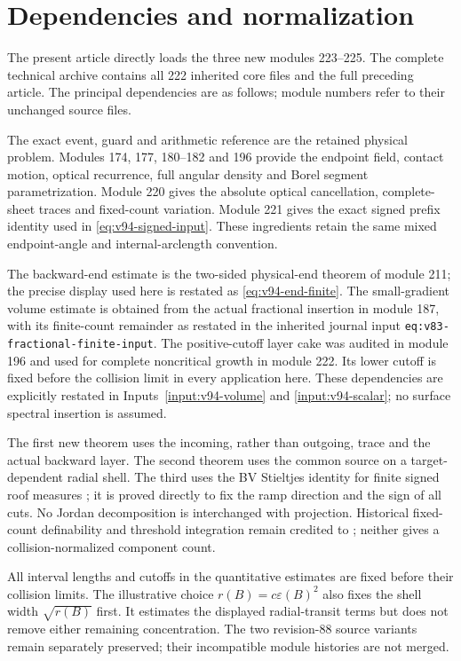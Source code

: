 \section{Dependencies and normalization}
\label{app:v94-dependencies}
The present article directly loads the three new modules 223--225.
The complete technical archive contains all 222 inherited core files
and the full preceding article. The principal dependencies are as
follows; module numbers refer to their unchanged source files.

The exact event, guard and arithmetic reference are the retained
physical problem. Modules 174, 177, 180--182 and 196 provide the
endpoint field, contact motion, optical recurrence, full angular
density and Borel segment parametrization. Module 220 gives the
absolute optical cancellation, complete-sheet traces and fixed-count
variation. Module 221 gives the exact signed prefix identity used in
\eqref{eq:v94-signed-input}. These ingredients retain the same mixed
endpoint-angle and internal-arclength convention.

The backward-end estimate is the two-sided physical-end theorem of
module 211; the precise display used here is restated as \eqref{eq:v94-end-finite}. The small-gradient volume estimate is
obtained from the actual fractional insertion in module 187, with its
finite-count remainder as restated in the inherited journal input
\texttt{eq:v83-fractional-finite-input}. The positive-cutoff layer cake
was audited in module 196 and used for complete noncritical growth in
module 222. Its lower cutoff is fixed before the collision limit in
every application here. These dependencies are explicitly restated in
Inputs~\ref{input:v94-volume} and \ref{input:v94-scalar}; no surface
spectral insertion is assumed.

The first new theorem uses the incoming, rather than outgoing, trace
and the actual backward layer. The second theorem uses the common
source on a target-dependent radial shell. The third uses the BV
Stieltjes identity for finite signed roof measures \cite{AFP}; it is
proved directly to fix the ramp direction and the sign of all cuts.
No Jordan decomposition is interchanged with projection. Historical
fixed-count definability and threshold integration remain credited to
\cite{Coste,CMInt}; neither gives a collision-normalized component count.

All interval lengths and cutoffs in the quantitative estimates are
fixed before their collision limits. The illustrative choice
$r(B)=c\varepsilon(B)^2$ also fixes the shell width $\sqrt{r(B)}$
first. It estimates the displayed radial-transit terms but does not
remove either remaining concentration. The two revision-88 source
variants remain separately preserved; their incompatible module
histories are not merged.
